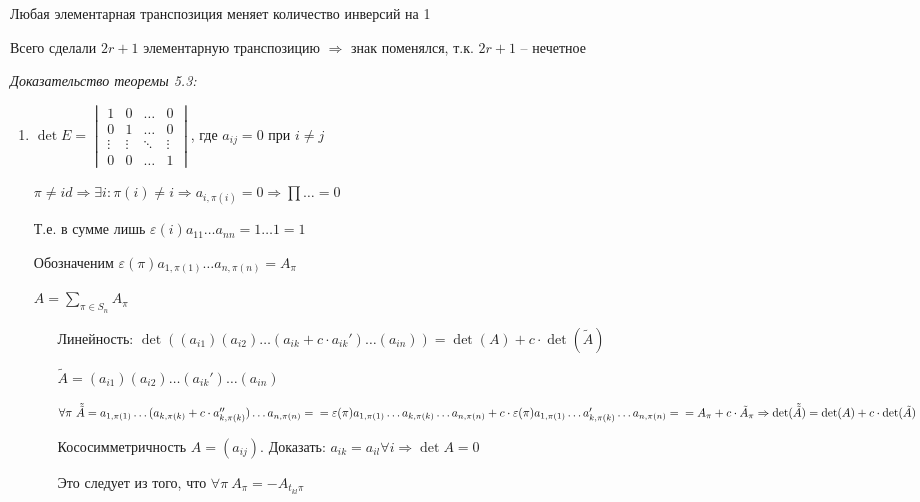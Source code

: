 \documentclass[12pt]{article}
\begin{document}
Любая элементарная транспозиция меняет количество инверсий на 1

Всего сделали $2r + 1$ элементарную транспозицию $\Rightarrow$ знак поменялся, т.к. $2r + 1$ -- нечетное

\textit{Доказательство теоремы 5.3:}

\begin{enumerate}
    \item $\det  E = \begin{vmatrix}
        1 & 0 & \ldots & 0 \\
        0 & 1 & \ldots & 0 \\
        \vdots & \vdots & \ddots & \vdots \\
        0 & 0 & \ldots & 1
    \end{vmatrix}$, где $a_{ij} = 0$ при $i \neq j$ 

    $\pi \neq id \Rightarrow \exists i : \pi(i) \neq i \Rightarrow a_{i, \pi(i)} = 0 \Rightarrow \prod \ldots = 0$

    Т.е. в сумме лишь $\varepsilon(i) a_{11} \ldots a_{nn} = 1 \ldots 1 = 1$

    Обозначеним $\varepsilon(\pi) a_{1, \pi(1)} \ldots a_{n, \pi(n)} = A_{\pi}$

    $A = \sum\limits_{\pi \in S_n} A_{\pi}$

    \begin{itemize}
        \item[Линейность:] $\det ((a_{i1})(a_{i2}) \ldots (a_{ik} + c \cdot a_{ik}') \ldots (a_{in})) = \det (A) + c \cdot \det (\tilde{A})$
        
        $\tilde{A} = (a_{i1})(a_{i2}) \ldots (a_{ik}') \ldots (a_{in})$

        $\forall \pi\ \tilde{\tilde{A}} = a_{1, \pi(1)} \ldots (a_{k, \pi(k)} + c \cdot a_{k, \pi(k)}'') \ldots a_{n, \pi(n)} = \\
        = \varepsilon(\pi) a_{1, \pi(1)} \ldots a_{k, \pi(k)} \ldots a_{n, \pi(n)} + c \cdot \varepsilon(\pi) a_{1, \pi(1)} \ldots a_{k, \pi(k)}' \ldots a_{n, \pi(n)} = \\
        = A_{\pi} + c \cdot \tilde{A}_{\pi} \Rightarrow \det (\tilde{\tilde{A}}) = \det (A) + c \cdot \det (\tilde{A})$

        \item[Кососимметричность] $A = (a_{ij})$. Доказать: $a_{ik} = a_{il} \forall i \Rightarrow \det A = 0$
        
        Это следует из того, что $\forall \pi\ A_\pi = -A_{t_{kl} \pi}$


\end{itemize}
\end{enumerate}
\end{document}
